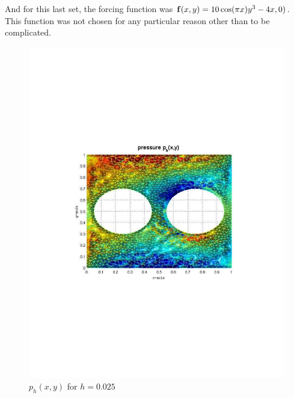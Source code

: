 \documentclass[12pt]{article}
\begin{document}
            And for this last set, the forcing function was $\mathbf{f}(x,y) =
            10 \cos(\pi x) y^3 - 4x, 0)$. This function was not chosen for any particular
            reason other than to be complicated.
                \begin{figure}[htb]
                    \begin{center}
                \includegraphics[scale=0.50]{./../files/crazy/p.pdf}
                \caption{$p_h(x,y)$ for $h = 0.025$}
            \end{center}
            \end{figure}
\end{document}
